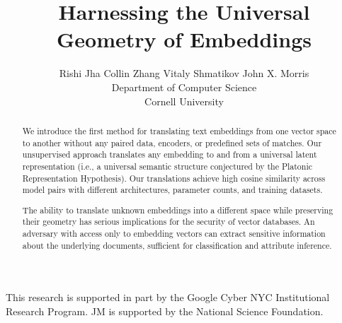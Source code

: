\documentclass{article}
\title{Harnessing the Universal Geometry of Embeddings}
\author{%
  Rishi Jha \quad Collin Zhang \quad Vitaly Shmatikov \quad John X. Morris\\
  Department of Computer Science\\
  Cornell University
}
\begin{document}
\maketitle

\begin{abstract}
We introduce the first method for translating text embeddings from one vector space to another without any paired data, encoders, or predefined sets of matches.  Our unsupervised approach translates any embedding to and from a universal latent representation (i.e., a universal semantic structure conjectured by the Platonic Representation Hypothesis).  Our translations achieve high cosine similarity across model pairs with different architectures, parameter counts, and training datasets.

The ability to translate unknown embeddings into a different space while preserving their geometry has serious implications for the security of vector databases.  An adversary with access only to embedding vectors can extract sensitive information about the underlying documents, sufficient for classification and attribute inference.

\end{abstract}









% 

\begin{ack}

This research is supported in part by the Google Cyber NYC Institutional Research Program.
JM is supported by the National Science Foundation.


\end{ack}

%     
%     
\printbibliography


\newpage
\appendix



% 
\end{document}
